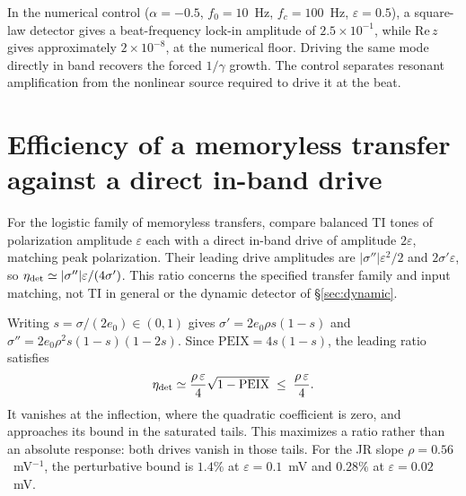 \documentclass[11pt,a4paper]{article}
\newcommand{\Sig}{\sigma}
\begin{document}
In the numerical control ($\alpha=-0.5$, $f_0=10$~Hz, $f_c=100$~Hz,
$\varepsilon=0.5$), a square-law detector gives a beat-frequency lock-in amplitude
of $2.5\times10^{-1}$, while $\mathrm{Re}\,z$ gives approximately
$2\times10^{-8}$, at the numerical floor. Driving the same mode directly in band
recovers the forced $1/\gamma$ growth. The control separates resonant amplification
from the nonlinear source required to drive it at the beat.

\section{Efficiency of a memoryless transfer against a direct in-band drive}\label{app:bound}
For the logistic family of memoryless transfers, compare balanced TI tones of
polarization amplitude $\varepsilon$ each with a direct in-band drive of amplitude
$2\varepsilon$, matching peak polarization. Their leading drive amplitudes are
$|\Sig''|\varepsilon^2/2$ and $2\Sig'\varepsilon$, so
$\eta_{\rm det}\simeq|\Sig''|\varepsilon/(4\Sig')$.
This ratio concerns the specified transfer family and input matching, not TI in
general or the dynamic detector of \S\ref{sec:dynamic}.

Writing $s=\Sig/(2e_0)\in(0,1)$ gives
$\Sig'=2e_0\rho s(1-s)$ and
$\Sig''=2e_0\rho^2s(1-s)(1-2s)$. Since
$\mathrm{PEIX}=4s(1-s)$, the leading ratio satisfies
\begin{equation}
\eta_{\rm det}\simeq\frac{\rho\,\varepsilon}{4}\sqrt{1-\mathrm{PEIX}}
\;\le\;\frac{\rho\,\varepsilon}{4}.
\label{eq:etabound}
\end{equation}
It vanishes at the inflection, where the quadratic coefficient is zero, and
approaches its bound in the saturated tails. This maximizes a ratio rather than
an absolute response: both drives vanish in those tails. For the JR slope
$\rho=0.56$~mV$^{-1}$, the perturbative bound is $1.4\%$ at
$\varepsilon=0.1$~mV and $0.28\%$ at $\varepsilon=0.02$~mV.
\end{document}
